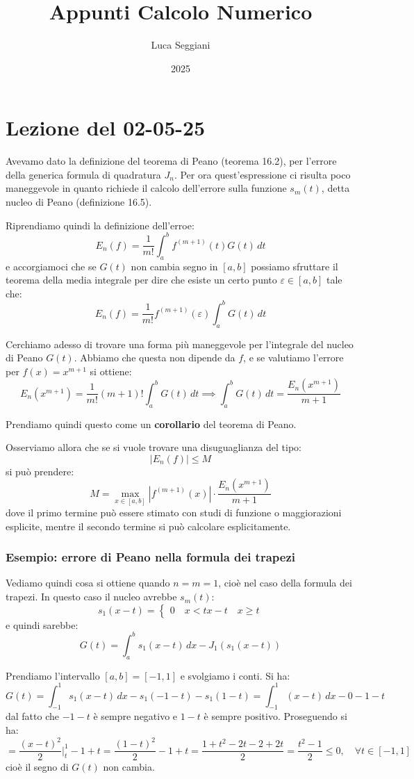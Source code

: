 \documentclass[a4paper,11pt]{article}
\title{Appunti Calcolo Numerico}
\author{Luca Seggiani}
\date{2025}
\begin{document}
\section{Lezione del 02-05-25}

\thispagestyle{empty}
\pagestyle{fancy}

Avevamo dato la definizione del teorema di Peano (teorema 16.2), per l'errore della generica formula di quadratura $J_n$.
Per ora quest'espressione ci risulta poco maneggevole in quanto richiede il calcolo dell'errore sulla funzione $s_m(t)$, detta nucleo di Peano (definizione 16.5).

Riprendiamo quindi la definizione dell'erroe:
$$
E_n(f) = \frac{1}{m!} \int_a^b f^{(m + 1)}(t) G(t) \, dt
$$
e accorgiamoci che se $G(t)$ non cambia segno in $[a, b]$ possiamo sfruttare il teorema della media integrale per dire che esiste un certo punto $\varepsilon \in [a, b]$ tale che:
$$
E_n(f) = \frac{1}{m!} f^{(m + 1)}(\varepsilon) \int_a^b G(t) \, dt
$$

Cerchiamo adesso di trovare una forma più maneggevole per l'integrale del nucleo di Peano $G(t)$.
Abbiamo che questa non dipende da $f$, e se valutiamo l'errore per $f(x) = x^{m + 1}$ si ottiene:
$$
E_n(x^{m + 1}) = \frac{1}{m!} (m + 1)! \int_a^b G(t) \, dt \implies \int_a^b G(t) \, dt = \frac{E_n(x^{m + 1})}{m + 1}
$$

Prendiamo quindi questo come un \textbf{corollario} del teorema di Peano.

Osserviamo allora che se si vuole trovare una disuguaglianza del tipo:
$$
|E_n(f)| \leq M
$$
si può prendere:
$$
M = \max_{x \in [a, b]} \left| f^{(m + 1)}(x) \right| \cdot \frac{E_n(x^{m + 1})}{m + 1}
$$
dove il primo termine può essere stimato con studi di funzione o maggiorazioni esplicite, mentre il secondo termine si può calcolare esplicitamente.

\subsubsection{Esempio: errore di Peano nella formula dei trapezi}
Vediamo quindi cosa si ottiene quando $n = m = 1$, cioè nel caso della formula dei trapezi.
In questo caso il nucleo avrebbe $s_m(t)$:
$$
s_1(x - t) =
\begin{cases}
	0 \quad x < t
	x - t \quad x \geq t
\end{cases}
$$
e quindi sarebbe:
$$
G(t) = \int_a^b s_1(x - t) \, dx - J_1 (s_1 (x - t))
$$

Prendiamo l'intervallo $[a, b] = [-1, 1]$ e svolgiamo i conti.
Si ha:
$$
G(t) = \int_{-1}^1 s_1(x - t) \, dx - s_1(-1 - t) - s_1(1 - t)
= \int_{-1}^1 (x - t) \, dx - 0 - 1 - t
$$
dal fatto che $-1 - t$ è sempre negativo e $1 - t$ è sempre positivo.
Proseguendo si ha:
$$
= \frac{(x - t)^2}{2} \Big|_t^1 - 1 + t = \frac{(1 - t)^2}{2} - 1 + t 
= \frac{1 + t^2 - 2t- 2 + 2t}{2} = \frac{t^2 - 1}{2} \leq 0, \quad \forall t \in [-1, 1]
$$
cioè il segno di $G(t)$ non cambia.
\end{document}
